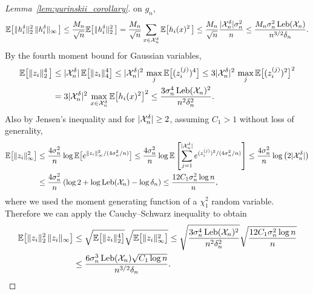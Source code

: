 \begin{proof}[Lemma~\ref{lem:yurinskii_corollary}]
  on $g_n$,
  \begin{align*}
    \mathbb{E}\big[\|h_i^\delta\|_2^2 \,
      \|h_i^\delta\|_\infty \,
    \big]
    \leq
    \frac{M_n}{\sqrt n}
    \mathbb{E}\big[\|h_i^\delta\|_2^2 \,
    \big]
    =
    \frac{M_n}{\sqrt n}
    \sum_{x \in \mathcal{X}_n^\delta}
    \mathbb{E}\big[h_i(x)^2 \,
    \big]
    \leq
    \frac{M_n}{\sqrt n}
    \frac{|\mathcal{X}_n^\delta| \sigma_n^2}{n}
    \leq
    \frac{M_n \sigma_n^2 \operatorname{Leb}(\mathcal{X}_n)}{n^{3/2}\delta_n}.
  \end{align*}
  By the fourth moment bound for Gaussian variables,
  \begin{align*}
    \mathbb{E}\big[
      \|z_i\|_2^4 \,
    \big]
    &\leq
    |\mathcal{X}_n^\delta| \,
    \mathbb{E}\big[
      \|z_i\|_4^4
    \big]
    \leq
    |\mathcal{X}_n^\delta|^2 \,
    \max_j
    \mathbb{E}\big[
      (z_i^{(j)})^4
    \big]
    \leq
    3
    |\mathcal{X}_n^\delta|^2 \,
    \max_j
    \mathbb{E}\big[
      (z_i^{(j)})^2
    \big]^2 \\
    &=
    3
    |\mathcal{X}_n^\delta|^2 \,
    \max_{x \in \mathcal{X}_n^\delta}
    \mathbb{E}\big[
      h_i(x)^2
    \big]^2
    \leq
    \frac{3\sigma_n^4 \operatorname{Leb}(\mathcal{X}_n)^2}{n^2\delta_n^2} .
  \end{align*}
  Also by Jensen's inequality
  and for $|\mathcal{X}_n^\delta| \geq 2$,
  assuming $C_1 > 1$ without loss of generality,
  \begin{align*}
    \mathbb{E}\big[
      \|z_i\|_\infty^2
    \big]
    &\leq
    \frac{4 \sigma_n^2}{n}
    \log
    \mathbb{E}\big[
      e^{\|z_i\|_\infty^2 / (4\sigma_n^2/n)}
    \big]
    \leq
    \frac{4 \sigma_n^2}{n}
    \log
    \mathbb{E}\left[
      \sum_{j=1}^{|\mathcal{X}_n^\delta|}
      e^{(z_i^{(j)})^2 / (4\sigma_n^2/n)}
    \right]
    \leq
    \frac{4\sigma_n^2}{n}
    \log \big(2|\mathcal{X}_n^\delta|\big) \\
    &\leq
    \frac{4\sigma_n^2}{n}
    \left(
      \log 2 + \log \operatorname{Leb}(\mathcal{X}_n) - \log \delta_n
    \right)
    \leq
    \frac{12 C_1 \sigma_n^2 \log n}{n},
  \end{align*}
  where we used the moment
  generating function of a $\chi_1^2$ random variable.
  Therefore we can apply the Cauchy--Schwarz inequality
  to obtain
  \begin{align*}
    \E\big[\|z_i\|_2^2 \,
      \|z_i\|_\infty
    \big]
    &\leq
    \sqrt{
      \E\big[\|z_i\|_2^4
    \big]}
    \sqrt{
      \E\big[
        \|z_i\|_\infty^2
    \big]}
    \leq
    \sqrt{
    \frac{3\sigma_n^4 \Leb(\cX_n)^2}{n^2\delta_n^2}}
    \sqrt{ \frac{12 C_1 \sigma_n^2 \log n}{n} } \\
    &\leq
    \frac{6\sigma_n^3
      \Leb(\cX_n)
    \sqrt{C_1 \log n}}{n^{3/2} \delta_n}.

\end{align*}
\end{proof}
